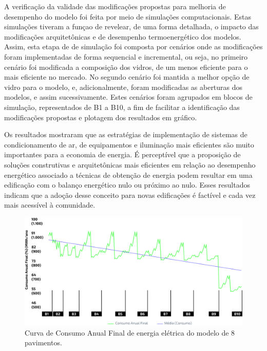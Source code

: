 \begin{onehalfspace}
    \noindent A verificação da validade das modificações propostas para melhoria de 
    desempenho do modelo foi feita por meio de simulações computacionais. Estas simulações
    tiveram a funçao de revelear, de uma forma detalhada, o impacto das modificações 
    arquitetônicas e de desempenho termoenergético dos modelos. Assim, esta etapa de 
    de simulação foi composta por cenários onde as modificações foram implementadas 
    de forma sequencial e incremental, ou seja, no primeiro cenário foi 
    modificada a composição dos vidros, de um menos eficiente para o mais eficiente 
    no mercado. No segundo cenário foi mantida a melhor opção de vidro para o modelo, e,
    adicionalmente, foram modificadas as aberturas dos modelos, e assim sucessivamente.
    Estes cenários foram agrupados em blocos de simulação, representados de B1 a B10, a fim
    de facilitar a identificação das modificações propostas e plotagem dos resultados em 
    gráfico.\vspace*{0.3cm}

    \noindent Os resultados mostraram que as estratégias de implementação de sistemas
    de condicionamento de ar, de equipamentos e iluminação mais eficientes são muito importantes
    para a economia de energia. É perceptível que a proposição de soluções construtivas e
    arquitetônicas mais eficientes em relação ao desempenho energético associado a técnicas de
    obtenção de energia podem resultar em uma edificação com o balanço energético nulo ou
    próximo ao nulo. Esses resultados indicam que a adoção desse conceito para novas edificações é
    factível e cada vez mais acessível à comunidade.\vspace*{0.3cm}
    \begin{figure}[H]
        \label{fig:4}
        \centering
        \includegraphics[width=1\textwidth]{figures/grafico-8pav.png}
        \caption{Curva de Consumo Anual Final de energia elétrica do modelo de 8 pavimentos.}
    \end{figure}


\end{onehalfspace}
